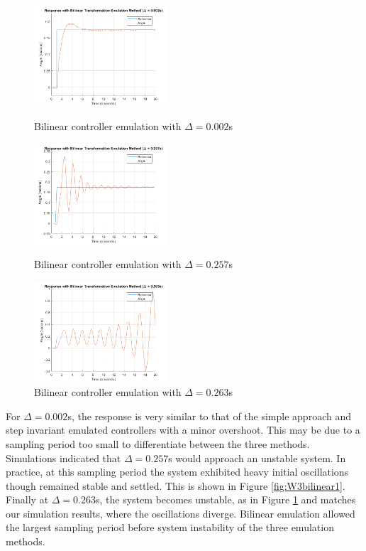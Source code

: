 \documentclass[11pt]{article}
\begin{document}
\begin{figure}[H]
\begin{minipage}{.3\textwidth}
    \centering
    \includegraphics[width=5cm]{plots/Bilinear.png}
    \caption{\small{Bilinear controller emulation with $\Delta = 0.002$s}}
    \label{fig:W3bilinear0}
\end{minipage}
\hspace{0.5cm}
\begin{minipage}{.3\textwidth}
    \centering
    \includegraphics[width=5cm]{plots/Bilinear_0_257.png}
    \caption{\small{Bilinear controller emulation with $\Delta = 0.257$s}}
    \label{fig:W3bilinear1}
\end{minipage}
\hspace{0.5cm}
\begin{minipage}{.3\textwidth}
    \centering
    \includegraphics[width=5cm]{plots/Bilinear_0_263.png}
    \caption{\small{Bilinear controller emulation with $\Delta = 0.263$s}}
    \label{fig:W3bilinear2}
\end{minipage}
\end{figure}
For $\Delta = 0.002$s, the response is very similar to that of the simple approach and step invariant emulated controllers with a minor overshoot. This may be due to a sampling period too small to differentiate between the three methods. Simulations indicated that $\Delta = 0.257$s would approach an unstable system. In practice, at this sampling period the system exhibited heavy initial oscillations though remained stable and settled. This is shown in Figure \ref{fig:W3bilinear1}. Finally at $\Delta = 0.263$s, the system becomes unstable, as in Figure \ref{fig:W3bilinear2} and matches our simulation results, where the oscillations diverge. Bilinear emulation allowed the largest sampling period before system instability of the three emulation methods.
\end{document}
